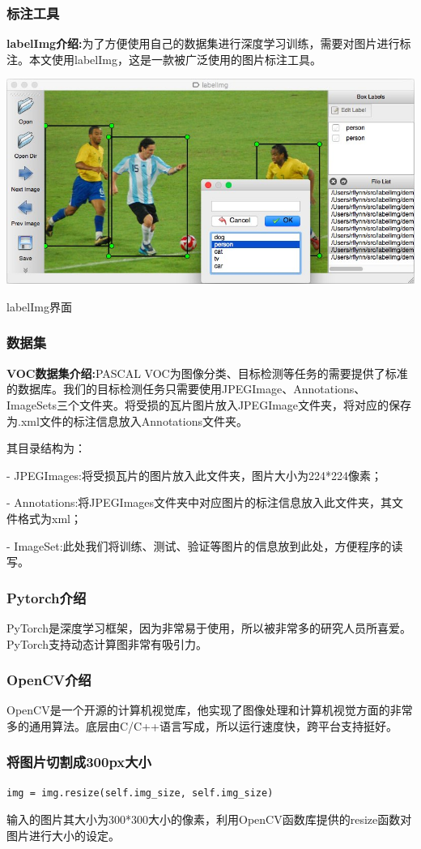 \subsubsection{标注工具}
\textbf{labelImg介绍:}为了方便使用自己的数据集进行深度学习训练，需要对图片进行标注。本文使用labelImg，这是一款被广泛使用的图片标注工具。
\begin{uscfigure}
	\includegraphics[width=\textwidth]{./Pictures/labelimg.jpg}	
	\caption{labelImg界面}
\end{uscfigure}
\subsubsection{数据集}
\textbf{VOC数据集介绍:}PASCAL VOC为图像分类、目标检测等任务的需要提供了标准的数据库。我们的目标检测任务只需要使用JPEGImage、Annotations、ImageSets三个文件夹。将受损的瓦片图片放入JPEGImage文件夹，将对应的保存为.xml文件的标注信息放入Annotations文件夹。

其目录结构为：

- JPEGImages:将受损瓦片的图片放入此文件夹，图片大小为224*224像素；

- Annotations:将JPEGImages文件夹中对应图片的标注信息放入此文件夹，其文件格式为xml；

- ImageSet:此处我们将训练、测试、验证等图片的信息放到此处，方便程序的读写。


\subsubsection{Pytorch介绍}
PyTorch是深度学习框架，因为非常易于使用，所以被非常多的研究人员所喜爱。PyTorch支持动态计算图非常有吸引力。
\subsubsection{OpenCV介绍}
OpenCV是一个开源的计算机视觉库，他实现了图像处理和计算机视觉方面的非常多的通用算法。底层由C/C++语言写成，所以运行速度快，跨平台支持挺好。
\subsubsection{将图片切割成300px大小}
\begin{lstlisting}[caption={图像切割}]
img = img.resize(self.img_size, self.img_size)
\end{lstlisting}

输入的图片其大小为300*300大小的像素，利用OpenCV函数库提供的resize函数对图片进行大小的设定。